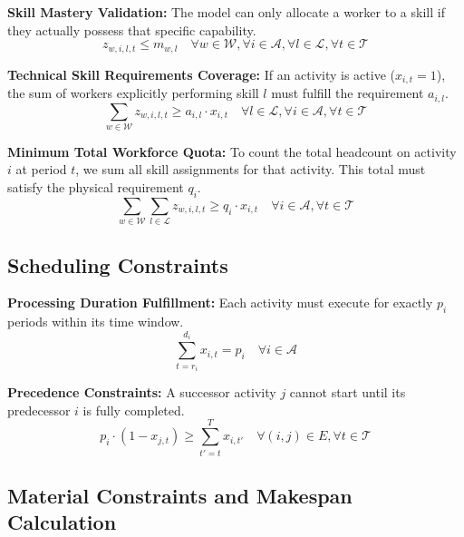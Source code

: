 \documentclass[preprint, authoryear,11pt]{elsarticle}
\begin{document}
\noindent \textbf{Skill Mastery Validation:} The model can only allocate a worker to a skill if they actually possess that specific capability.
\begin{equation}
    z_{w,i,l,t} \leq m_{w,l} \quad \forall w \in \mathcal{W}, \forall i \in \mathcal{A}, \forall l \in \mathcal{L}, \forall t \in \mathcal{T}
\end{equation}

\noindent \textbf{Technical Skill Requirements Coverage:} If an activity is active ($x_{i,t} = 1$), the sum of workers explicitly performing skill $l$ must fulfill the requirement $a_{i,l}$.
\begin{equation}
    \sum_{w \in \mathcal{W}} z_{w,i,l,t} \geq a_{i,l} \cdot x_{i,t} \quad \forall l \in \mathcal{L}, \forall i \in \mathcal{A}, \forall t \in \mathcal{T}
\end{equation}

\noindent \textbf{Minimum Total Workforce Quota:} To count the total headcount on activity $i$ at period $t$, we sum all skill assignments for that activity. This total must satisfy the physical requirement $q_i$.
\begin{equation}
    \sum_{w \in \mathcal{W}} \sum_{l \in \mathcal{L}} z_{w,i,l,t} \geq q_i \cdot x_{i,t} \quad \forall i \in \mathcal{A}, \forall t \in \mathcal{T}
\end{equation}

\subsection{Scheduling Constraints}

\noindent \textbf{Processing Duration Fulfillment:} Each activity must execute for exactly $p_i$ periods within its time window.
\begin{equation}
    \sum_{t=r_i}^{d_i} x_{i,t} = p_i \quad \forall i \in \mathcal{A}
\end{equation}

\noindent \textbf{Precedence Constraints:} A successor activity $j$ cannot start until its predecessor $i$ is fully completed.
\begin{equation}
    p_i \cdot (1 - x_{j,t}) \geq \sum_{t'=t}^T x_{i,t'} \quad \forall (i,j) \in E, \forall t \in \mathcal{T}
\end{equation}

\subsection{Material Constraints and Makespan Calculation}
\end{document}
